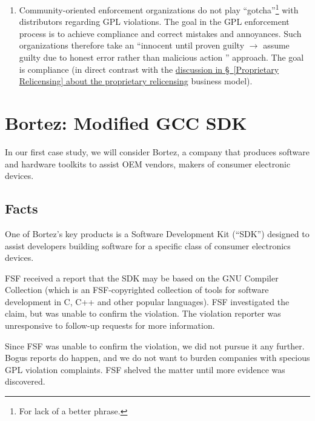 \begin{enumerate}
  \item Community-oriented enforcement organizations do not play ``gotcha''\footnote{For lack of a better
    phrase.} with distributors regarding GPL
    violations.  The goal in the GPL enforcement process is to achieve
    compliance and correct mistakes and annoyances.  Such organizations
    therefore take an ``innocent until proven guilty $\rightarrow$ assume guilty
    due to honest error rather than malicious action '' approach.  The goal
    is compliance (in direct contrast with
    the \hyperref[Proprietary Relicensing]{discussion in \S~\ref*{Proprietary Relicensing} about the
      proprietary relicensing} business model).
    
\end{enumerate}

\chapter{Bortez: Modified GCC SDK}

In our first case study, we will consider Bortez, a company that
produces software and hardware toolkits to assist OEM vendors, makers
of consumer electronic devices.

\section{Facts}

One of Bortez's key products is a Software Development Kit (``SDK'')
designed to assist developers building software for a specific class of
consumer electronics devices.

FSF received a report that the SDK may be based on the GNU Compiler
Collection (which is an FSF-copyrighted collection of tools for software
development in C, C++ and other popular languages). FSF investigated the
claim, but was unable to confirm the violation. The violation reporter
was unresponsive to follow-up requests for more information.

Since FSF was unable to confirm the violation, we did not pursue it any
further. Bogus reports do happen, and we do not want to burden companies
with specious GPL violation complaints. FSF shelved the matter until
more evidence was discovered.

